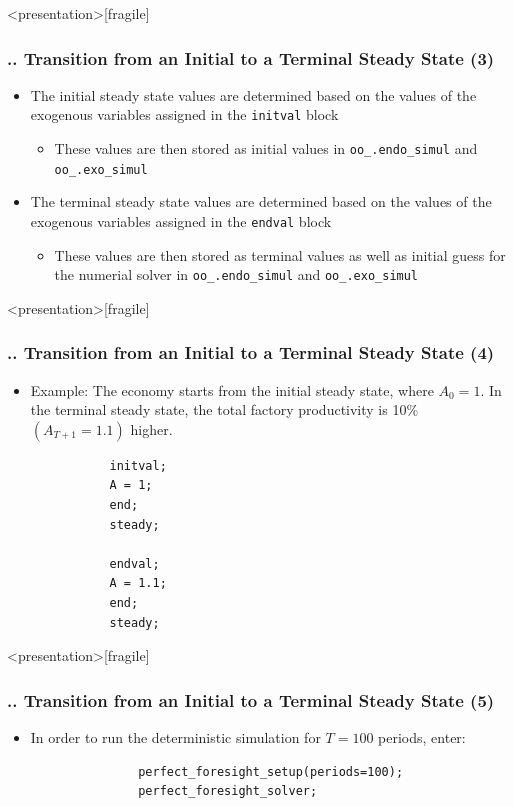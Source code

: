 \documentclass[11pt,aspectratio=169]{beamer}
\begin{document}
\begin{frame}<presentation>[fragile]
	\frametitle{{\thesection.\thesubsection.\thesubsubsection} Transition from an Initial to a Terminal Steady State (3)}
	\begin{itemize}
		\item The initial steady state values are determined based on the values of the exogenous variables assigned in the \texttt{initval} block 
		\begin{itemize}
			\item These values are then stored as initial values in \texttt{oo\_.endo\_simul} and \texttt{oo\_.exo\_simul}
		\end{itemize}
		\item The terminal steady state values are determined based on the values of the exogenous variables assigned in the \texttt{endval} block 
		\begin{itemize}
			\item These values are then stored as terminal values as well as initial guess for the numerial solver in \texttt{oo\_.endo\_simul} and \texttt{oo\_.exo\_simul}
		\end{itemize}
	\end{itemize}
\end{frame}
\begin{frame}<presentation>[fragile]
	\frametitle{{\thesection.\thesubsection.\thesubsubsection} Transition from an Initial to a Terminal Steady State (4)}
	\begin{itemize}
		\item Example: The economy starts from the initial steady state, where $A_0=1$. In the terminal steady state, the total factory productivity is 10\% $(A_{T+1}=1.1)$ higher.
		\begin{verbatim}
		   initval;
		   A = 1;
		   end; 
		   steady;
		
		   endval;
		   A = 1.1;
		   end;
		   steady;
		\end{verbatim}
	\end{itemize}
\end{frame}
\begin{frame}<presentation>[fragile]
	\frametitle{{\thesection.\thesubsection.\thesubsubsection} Transition from an Initial to a Terminal Steady State (5)}
		\begin{itemize}
			\item In order to run the deterministic simulation for $T=100$ periods, enter:
			\begin{verbatim}
			   perfect_foresight_setup(periods=100);
			   perfect_foresight_solver;
			\end{verbatim}
		\end{itemize}
\end{frame}
\end{document}
